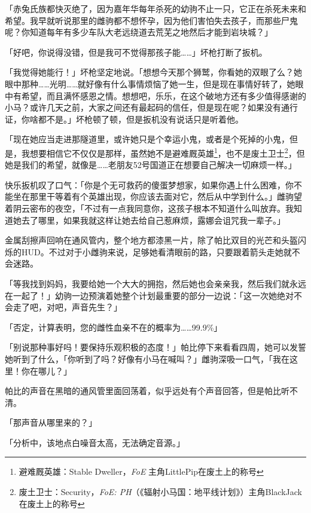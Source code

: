 「赤兔氏族都快灭绝了，因为嘉年华每年杀死的幼驹不止一只，它正在杀死未来和希望。我早就听说那里的雌驹都不想怀孕，因为他们害怕失去孩子，而那些尸鬼呢？你知道每年有多少车队大老远绕道去荒芜之地然后才能到岩块城？」

「好吧，你说得没错，但是我可不觉得那孩子能……」坏枪打断了扳机。

「我觉得她能行！」坏枪坚定地说。「想想今天那个狮鹫，你看她的双眼了么？她眼中那种……光明……就好像有什么事情烦恼了她一生，但是现在事情好转了，她眼中有希望，而且满怀感恩之情。想想吧，乐乐，在这个破地方还有多少值得感谢的小马？或许几天之前，大家之间还有最起码的信任，但是现在呢？如果没有通行证，你啥都不是。」坏枪顿了顿，但是扳机没有说话只是听着他。

「现在她应当走进那隧道里，或许她只是个幸运小鬼，或者是个死掉的小鬼，但是，我想要相信它不仅仅是那样，虽然她不是避难厩英雄\footnote{避难厩英雄：Stable Dweller，\emph{FoE} 主角LittlePip在废土上的称号}，也不是废土卫士\footnote{废土卫士：Security，\emph{FoE: PH}（《辐射小马国：地平线计划》）主角BlackJack在废土上的称号}，但她是我们的希望，就像是……老朋友52号国道正在想要自己解决一切麻烦一样。」

快乐扳机叹了口气：「你是个无可救药的傻蛋梦想家，如果你遇上什么困难，你不能坐在那里干等着有个英雄出现，你应该去面对它，然后从中学到什么。」雌驹望着阴云密布的夜空，「不过有一点我同意你，这孩子根本不知道什么叫放弃。我知道她去了哪里，如果我就这样让她去给自己惹麻烦，露娜会诅咒我一辈子。」

\horizonline


金属刮擦声回响在通风管内，整个地方都漆黑一片，除了帕比双目的光芒和头盔闪烁的HUD。不过对于小雌驹来说，足够她看清眼前的路，只要跟着箭头走她就不会迷路。

「等我找到妈妈，我要给她一个大大的拥抱，然后她也会亲亲我，然后我们就永远在一起了！」幼驹一边预演着她整个计划最重要的部分一边说：「这一次她绝对不会走了吧，对吧，声音先生？」

「{\mt 否定，计算表明，您的雌性血亲不在的概率为……99.9\%}」

「别说那种事好吗！要保持乐观积极的态度！」帕比停下来看看四周，她可以发誓她听到了什么，「你听到了吗？好像有小马在喊叫？」雌驹深吸一口气，「我在这里！你在哪儿？」

帕比的声音在黑暗的通风管里面回荡着，似乎远处有个声音回答，但是帕比听不清。

「那声音从哪里来的？」

「{\mt 分析中，该地点白噪音太高，无法确定音源。}」

